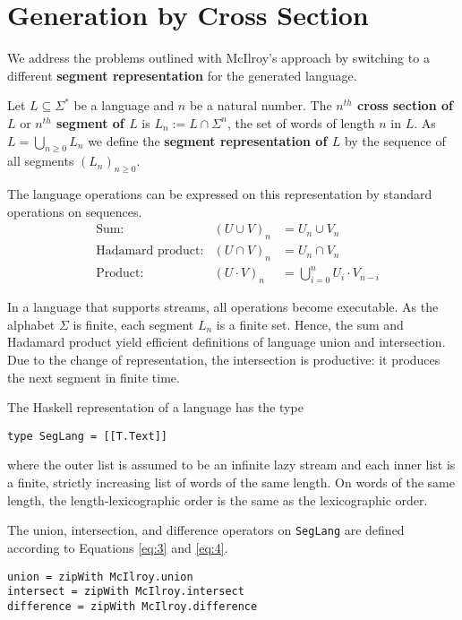 \section{Generation by Cross Section}
\label{sec:gener-cross-sect}

We address the problems outlined with McIlroy's approach by switching to a
different \textbf{segment representation} for the generated language.

Let $L\subseteq\Sigma^*$ be a language and $n$ be a natural
number. The \textbf{$n^{th}$ cross section of $L$} or
\textbf{$n^{th}$ segment of $L$} is $L_n := L \cap \Sigma^n$, the set of
words of length $n$ in $L$. As $L = \bigcup_{n\ge0} L_n$ we
define the \textbf{segment representation of $L$} by the
sequence of all segments $(L_n)_{n\ge0}$.

The language operations can be expressed on this representation by
standard operations on sequences.
\begin{align}
  \label{eq:3}
  &\text{Sum:}
  & (U \cup V)_n &= U_n \cup V_n \\
  \label{eq:4}
  &\text{Hadamard product:}
  & (U \cap V)_n &= U_n \cap V_n \\
  \label{eq:1}
  &\text{Product:}
  & (U \cdot V)_n &= \bigcup_{i=0}^n U_i\cdot V_{n-i}
\end{align}

In a language that supports streams, all operations become executable.
%
As the alphabet $\Sigma$ is finite, each segment $L_n$ is a finite set. Hence, the sum and
Hadamard product yield efficient definitions of language union and intersection. Due to
the change of representation, the intersection is productive: it produces the next segment
in finite time.

The Haskell representation of a language has the type
\begin{lstlisting}[numbers=none]
type SegLang = [[T.Text]]
\end{lstlisting}
where the outer list is assumed to be an infinite lazy stream and each inner list is
a finite, strictly increasing list of words of the same length. On
words of the same length, the length-lexicographic order is the same
as the lexicographic order.

The union, intersection, and difference operators on
\lstinline{SegLang} are defined according to Equations \eqref{eq:3} and
\eqref{eq:4}.
\begin{lstlisting}[numbers=none]
union = zipWith McIlroy.union
intersect = zipWith McIlroy.intersect
difference = zipWith McIlroy.difference
\end{lstlisting}

